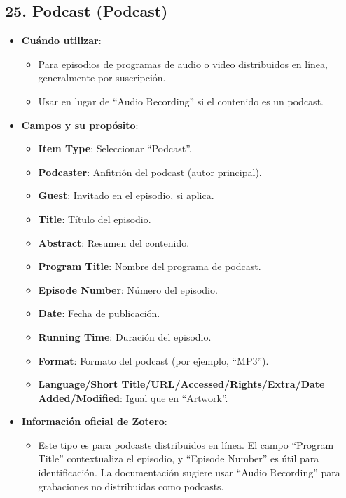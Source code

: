 \documentclass[
  jou,
  floatsintext,
  longtable,
  a4paper,
  nolmodern,
  notxfonts,
  notimes,
  colorlinks=true,linkcolor=blue,citecolor=blue,urlcolor=blue]{apa7}
\providecommand{\tightlist}{%
  \setlength{\itemsep}{0pt}\setlength{\parskip}{0pt}}
\begin{document}
\subsection{25. Podcast (Podcast)}\label{podcast-podcast}

\begin{itemize}
\tightlist
\item
  \textbf{Cuándo utilizar}:

  \begin{itemize}
  \tightlist
  \item
    Para episodios de programas de audio o video distribuidos en línea,
    generalmente por suscripción.
  \item
    Usar en lugar de ``Audio Recording'' si el contenido es un podcast.
  \end{itemize}
\item
  \textbf{Campos y su propósito}:

  \begin{itemize}
  \tightlist
  \item
    \textbf{Item Type}: Seleccionar ``Podcast''.
  \item
    \textbf{Podcaster}: Anfitrión del podcast (autor principal).
  \item
    \textbf{Guest}: Invitado en el episodio, si aplica.
  \item
    \textbf{Title}: Título del episodio.
  \item
    \textbf{Abstract}: Resumen del contenido.
  \item
    \textbf{Program Title}: Nombre del programa de podcast.
  \item
    \textbf{Episode Number}: Número del episodio.
  \item
    \textbf{Date}: Fecha de publicación.
  \item
    \textbf{Running Time}: Duración del episodio.
  \item
    \textbf{Format}: Formato del podcast (por ejemplo, ``MP3'').
  \item
    \textbf{Language/Short Title/URL/Accessed/Rights/Extra/Date
    Added/Modified}: Igual que en ``Artwork''.
  \end{itemize}
\item
  \textbf{Información oficial de Zotero}:

  \begin{itemize}
  \tightlist
  \item
    Este tipo es para podcasts distribuidos en línea. El campo ``Program
    Title'' contextualiza el episodio, y ``Episode Number'' es útil para
    identificación. La documentación sugiere usar ``Audio Recording''
    para grabaciones no distribuidas como podcasts.
  \end{itemize}
\end{itemize}
\end{document}
